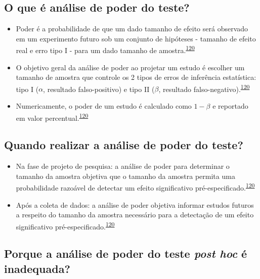 \documentclass[
  a4paper,
]{book}
\begin{document}
\hypertarget{o-que-uxe9-anuxe1lise-de-poder-do-teste}{%
\subsection{O que é análise de poder do teste?}\label{o-que-uxe9-anuxe1lise-de-poder-do-teste}}

\begin{itemize}
\item
  Poder é a probabilidade de que um dado tamanho de efeito será observado em um experimento futuro sob um conjunto de hipóteses - tamanho de efeito real e erro tipo I - para um dado tamanho de amostra.\textsuperscript{\protect\hyperlink{ref-heckman2022}{120}}
\item
  O objetivo geral da análise de poder ao projetar um estudo é escolher um tamanho de amostra que controle os 2 tipos de erros de inferência estatística: tipo I (\(\alpha\), resultado falso-positivo) e tipo II (\(\beta\), resultado falso-negativo).\textsuperscript{\protect\hyperlink{ref-heckman2022}{120}}
\item
  Numericamente, o poder de um estudo é calculado como \(1-\beta\) e reportado em valor percentual.\textsuperscript{\protect\hyperlink{ref-heckman2022}{120}}
\end{itemize}

\hypertarget{quando-realizar-a-anuxe1lise-de-poder-do-teste}{%
\subsection{Quando realizar a análise de poder do teste?}\label{quando-realizar-a-anuxe1lise-de-poder-do-teste}}

\begin{itemize}
\item
  Na fase de projeto de pesquisa: a análise de poder para determinar o tamanho da amostra objetiva que o tamanho da amostra permita uma probabilidade razoável de detectar um efeito significativo pré-especificado.\textsuperscript{\protect\hyperlink{ref-heckman2022}{120}}
\item
  Após a coleta de dados: a análise de poder objetiva informar estudos futuros a respeito do tamanho da amostra necessário para a detectação de um efeito significativo pré-especificado.\textsuperscript{\protect\hyperlink{ref-heckman2022}{120}}
\end{itemize}

\hypertarget{porque-a-anuxe1lise-de-poder-do-teste-post-hoc-uxe9-inadequada}{%
\subsection{\texorpdfstring{Porque a análise de poder do teste \emph{post hoc} é inadequada?}{Porque a análise de poder do teste post hoc é inadequada?}}\label{porque-a-anuxe1lise-de-poder-do-teste-post-hoc-uxe9-inadequada}}
\end{document}
